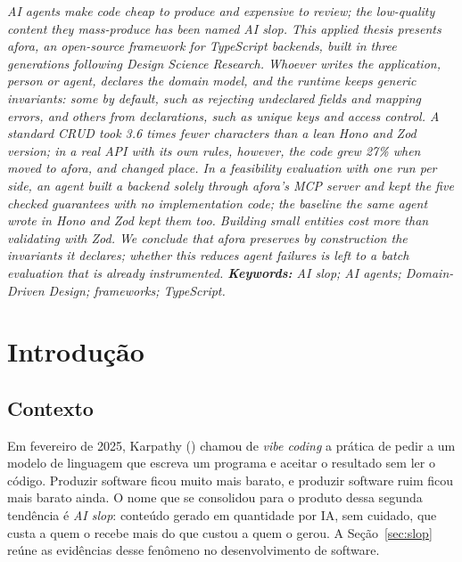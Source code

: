 \documentclass[a4paper,12pt]{article}
\renewenvironment{abstract}{%
  \list{}{\advance\topsep by6pt\relax
    \leftmargin=0.8cm
    \labelwidth=0pt
    \listparindent=0pt
    \itemindent\listparindent
    \rightmargin\leftmargin}\item[\hskip\labelsep\bfseries\itshape Abstract.]\itshape}%
  {\endlist}
\newcommand{\estr}[1]{\textit{#1}}
\begin{document}
\vspace{6pt}

\begin{abstract}
AI agents make code cheap to produce and expensive to review; the low-quality content they mass-produce has been named AI slop. This applied thesis presents afora, an open-source framework for TypeScript backends, built in three generations following Design Science Research. Whoever writes the application, person or agent, declares the domain model, and the runtime keeps generic invariants: some by default, such as rejecting undeclared fields and mapping errors, and others from declarations, such as unique keys and access control. A standard CRUD took 3.6 times fewer characters than a lean Hono and Zod version; in a real API with its own rules, however, the code grew 27\% when moved to afora, and changed place. In a feasibility evaluation with one run per side, an agent built a backend solely through afora's MCP server and kept the five checked guarantees with no implementation code; the baseline the same agent wrote in Hono and Zod kept them too. Building small entities cost more than validating with Zod. We conclude that afora preserves by construction the invariants it declares; whether this reduces agent failures is left to a batch evaluation that is already instrumented.
\end{abstract}
\noindent\textbf{Keywords:} AI slop; AI agents; Domain-Driven Design; frameworks; TypeScript.

\vspace{18pt}

\section{Introdução}

\subsection{Contexto}

Em fevereiro de 2025, Karpathy (\citeyear{karpathy2025}) chamou de \estr{vibe coding} a prática de pedir a um modelo de linguagem que escreva um programa e aceitar o resultado sem ler o código. Produzir software ficou muito mais barato, e produzir software ruim ficou mais barato ainda. O nome que se consolidou para o produto dessa segunda tendência é \estr{AI slop}: conteúdo gerado em quantidade por IA, sem cuidado, que custa a quem o recebe mais do que custou a quem o gerou. A Seção~\ref{sec:slop} reúne as evidências desse fenômeno no desenvolvimento de software.
\end{document}
